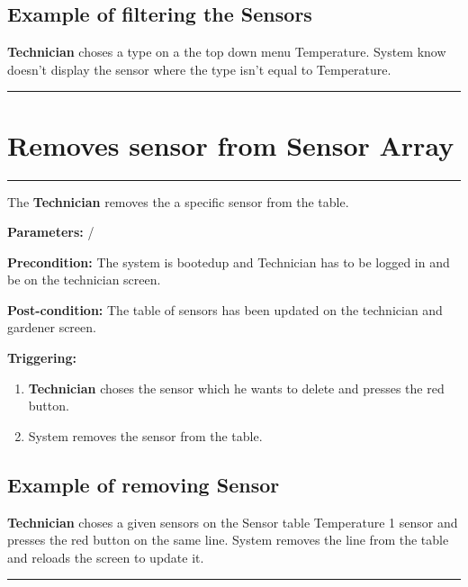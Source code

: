 \subsection{Example of filtering the Sensors}
\textbf{Technician} choses a type on a the top down menu Temperature. System
know doesn't display the sensor where the type isn't equal to Temperature.
\hfill
\vspace{0.5cm}
\hrule






\section{Removes sensor from Sensor Array}

\hrule
\hfill
\vspace{0.5cm}

\label{operation:removesSensor}

The \textbf{Technician} removes the a specific sensor from the table.
\begin{description}

\item \textbf{Parameters:} /
\item \textbf{Precondition:} The system is bootedup and Technician has to be
logged in and be on the technician screen.
\item \textbf{Post-condition:} The table of sensors has been updated on the
technician and gardener screen.

\item \textbf{Triggering:}
\begin{enumerate}
\item \textbf{Technician} choses the sensor which he wants to delete and presses
the red button.
\item System removes the sensor from the table.
\end{enumerate}
\end{description}

\subsection{Example of removing Sensor}
\textbf{Technician} choses a given sensors on the Sensor table Temperature 1
sensor and presses the red button on the same line.
System removes the line from the table and reloads the screen to update it.

 \hfill
\vspace{0.5cm}
\hrule



